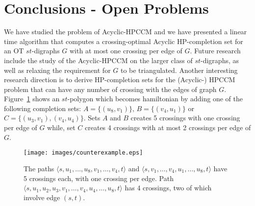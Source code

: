 \documentclass{myllncs-mixalis}
\begin{document}
\newpage
\section{Conclusions - Open Problems}
We have studied the problem of Acyclic-HPCCM and we have presented a
linear time algorithm that computes a crossing-optimal Acyclic
HP-completion set for an OT $st$-digraphs $G$ with at most one
crossing per edge of $G$. Future research include the study of the
Acyclic-HPCCM on the larger class of $st$-digraphs, as well as
relaxing the requirement for $G$ to be triangulated. Another
interesting research direction is to derive HP-completion sets for
the (Acyclic-) HPCCM problem that can have any number of crossing
with the edges of graph $G$. Figure~{\ref{fig:cntrexmpl}} shows an
$st$-polygon which becomes hamiltonian by adding one of the
following completion sets: $A=\{(u_8, v_1)\}$, $B=\{(v_4, u_1)\}$ or
$C=\{(u_3,v_1), (v_4,u_4)\}$. Sets $A$ and $B$ creates 5 crossings
with one crossing per edge of $G$ while, set $C$ creates 4 crossings
with at most 2 crossings per edge of $G$.

\begin{figure}[htb]
    \begin{minipage}{\textwidth}
    \centering
    \texttt{[image: images/counterexample.eps]}
    \caption{The paths $\langle s,u_1,\dots,u_8,v_1,\dots,v_4,t\rangle$ and
    $\langle s,v_1,\dots,v_4,u_1,\dots,u_8,t\rangle$ have 5 crossings each, with one crossing per edge.
    Path
    $\langle s,u_1,u_2,u_3,v_1,\dots,v_4,u_4,\dots,u_8,t\rangle$ has 4 crossings,
    two of which involve edge $(s,t)$.}
    \label{fig:cntrexmpl}
  \end{minipage}
\end{figure}
\end{document}
